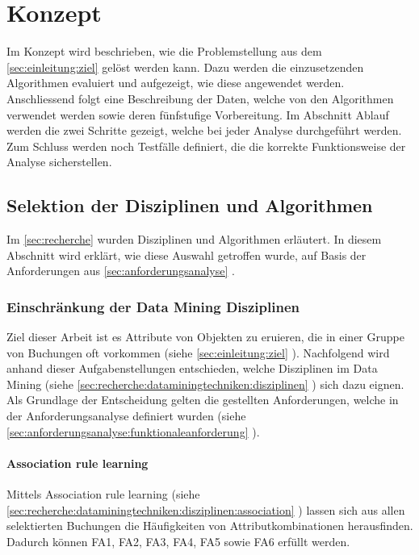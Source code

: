 \chapter{Konzept}
\label{sec:konzept}
Im Konzept wird beschrieben, wie die Problemstellung aus dem \cref{sec:einleitung:ziel}  gelöst werden kann. Dazu werden die einzusetzenden Algorithmen evaluiert und aufgezeigt, wie diese angewendet werden. Anschliessend folgt eine Beschreibung der Daten, welche von den Algorithmen verwendet werden sowie deren fünfstufige Vorbereitung. Im Abschnitt Ablauf werden die zwei Schritte gezeigt, welche bei jeder Analyse durchgeführt werden. Zum Schluss werden noch Testfälle definiert, die die korrekte Funktionsweise der Analyse sicherstellen.

\section{Selektion der Disziplinen und Algorithmen}
\label{sec:konzept:disziplin-und-algorithmen}
Im \cref{sec:recherche}  wurden Disziplinen und Algorithmen erläutert. In diesem Abschnitt wird erklärt, wie diese Auswahl getroffen wurde, auf Basis der Anforderungen aus \cref{sec:anforderungsanalyse} .

\subsection{Einschränkung der Data Mining Disziplinen}
\label{sec:konzept:disziplinauswahl}
Ziel dieser Arbeit ist es Attribute von Objekten zu eruieren, die in einer Gruppe von Buchungen oft vorkommen (siehe \cref{sec:einleitung:ziel} ). Nachfolgend wird anhand dieser Aufgabenstellungen entschieden, welche Disziplinen im Data Mining (siehe \cref{sec:recherche:dataminingtechniken:disziplinen} ) sich dazu eignen. Als Grundlage der Entscheidung gelten die gestellten Anforderungen, welche in der Anforderungsanalyse definiert wurden (siehe \cref{sec:anforderungsanalyse:funktionaleanforderung} ).


\subsubsection{Association rule learning}
\label{sec:konzept:disziplinauswahl:association}
Mittels Association rule learning (siehe \cref{sec:recherche:dataminingtechniken:disziplinen:association} ) lassen sich aus allen selektierten Buchungen die Häufigkeiten von Attributkombinationen herausfinden. Dadurch können FA1, FA2, FA3, FA4, FA5 sowie FA6 erfüllt werden.


